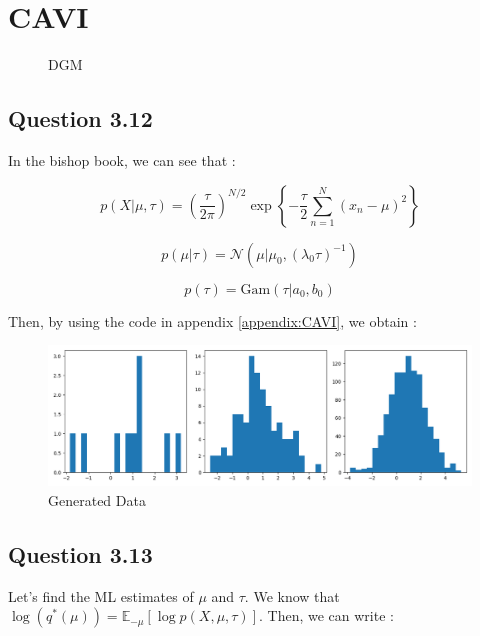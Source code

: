 \documentclass{article}
\begin{document}
\section{CAVI}

\begin{figure}[H]
    \centering
    
    \caption{DGM}
    \label{fig:fig3}
\end{figure}

\subsection*{Question 3.12}

In the bishop book, we can see that :

\begin{equation}
    p(X|\mu, \tau) = \left(\frac{\tau}{2\pi}\right)^{N/2} \exp\left\{-\frac{\tau}{2}\sum_{n=1}^{N}(x_n - \mu)^2\right\}
\end{equation}

\begin{equation}
    p(\mu|\tau) = \mathcal{N}(\mu|\mu_0, (\lambda_0 \tau)^{-1})
\end{equation}

\begin{equation}
    p(\tau) = \text{Gam}(\tau|a_0, b_0)
\end{equation}

Then, by using the code in appendix \ref{appendix:CAVI}, we obtain :

\begin{figure}[H]
    \centering
    \includegraphics[scale=0.5]{images/12_data.png}
    \caption{Generated Data}
    \label{fig:3.12}
\end{figure}

\subsection*{Question 3.13}

Let's find the ML estimates of $\mu$ and $\tau$.
We know that $\log(q^*(\mu)) = \mathbb{E}_{-\mu}[\log p(X, \mu, \tau)]$.
Then, we can write :
\end{document}
